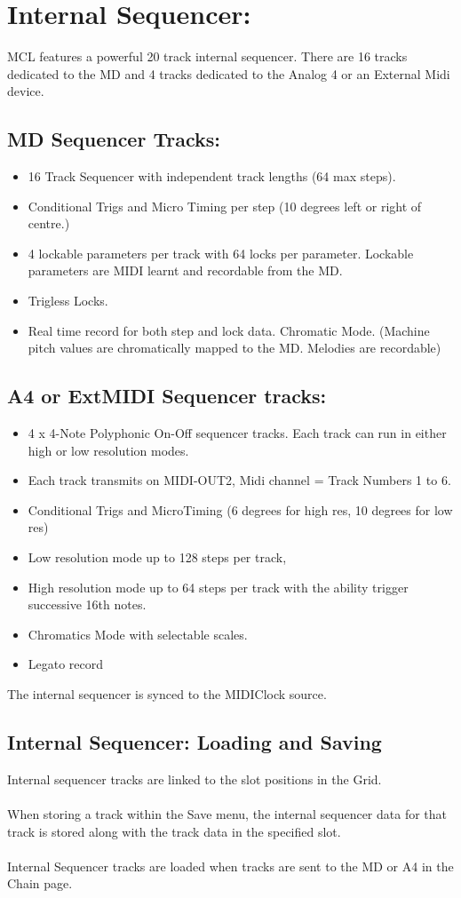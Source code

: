 \chapter{Internal Sequencer:}
MCL features a powerful 20 track internal sequencer. There are 16 tracks dedicated to the MD and 4 tracks dedicated to the Analog 4 or an External Midi device.
\section{MD Sequencer Tracks:}
\begin{itemize}
\item 16 Track Sequencer with independent track lengths (64 max steps).
\item Conditional Trigs and Micro Timing per step (10 degrees left or right of centre.)
\item 4 lockable parameters per track with 64 locks per parameter. Lockable parameters are MIDI learnt and recordable from the MD.
\item Trigless Locks.
\item Real time record for both step and lock data.
Chromatic Mode. (Machine pitch values are chromatically mapped to the MD. Melodies are recordable)
\end{itemize}
\section{A4 or ExtMIDI Sequencer tracks:}
\begin{itemize}
\item 4 x 4-Note Polyphonic On-Off sequencer tracks. Each track can run in either high or low resolution modes. 
\item Each track transmits on MIDI-OUT2, Midi channel = Track Numbers 1 to 6.
\item Conditional Trigs and MicroTiming (6 degrees for high res, 10 degrees for low res)
\item Low resolution mode up to 128 steps per track,
\item High resolution mode up to 64 steps per track with the ability trigger successive 16th notes.
\item Chromatics Mode with selectable scales.
\item Legato record
\end{itemize}
The internal sequencer is synced to the MIDIClock source.
\\
\section{Internal Sequencer: Loading and Saving}
Internal sequencer tracks are linked to the slot positions in the Grid.\\
\\
When storing a track within the Save menu, the internal sequencer data for that track is stored along with the track data in the specified slot.\\
\\
Internal Sequencer tracks are loaded when tracks are sent to the MD or A4 in the Chain page.



